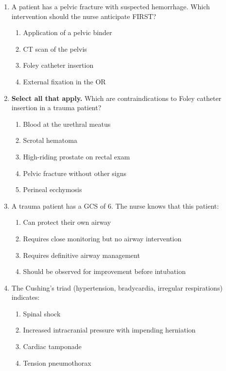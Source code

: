 \documentclass[11pt]{article}
\begin{document}
\begin{enumerate}
\item A patient has a pelvic fracture with suspected hemorrhage. Which intervention should the nurse anticipate FIRST?

\begin{enumerate}[label=\Alph*.]
    \item Application of a pelvic binder
    \item CT scan of the pelvis
    \item Foley catheter insertion
    \item External fixation in the OR
\end{enumerate}

\item \textbf{Select all that apply.} Which are contraindications to Foley catheter insertion in a trauma patient?

\begin{enumerate}[label=\Alph*.]
    \item Blood at the urethral meatus
    \item Scrotal hematoma
    \item High-riding prostate on rectal exam
    \item Pelvic fracture without other signs
    \item Perineal ecchymosis
\end{enumerate}

\item A trauma patient has a GCS of 6. The nurse knows that this patient:

\begin{enumerate}[label=\Alph*.]
    \item Can protect their own airway
    \item Requires close monitoring but no airway intervention
    \item Requires definitive airway management
    \item Should be observed for improvement before intubation
\end{enumerate}

\item The Cushing's triad (hypertension, bradycardia, irregular respirations) indicates:

\begin{enumerate}[label=\Alph*.]
    \item Spinal shock
    \item Increased intracranial pressure with impending herniation
    \item Cardiac tamponade
    \item Tension pneumothorax
\end{enumerate}


\end{enumerate}
\end{document}
